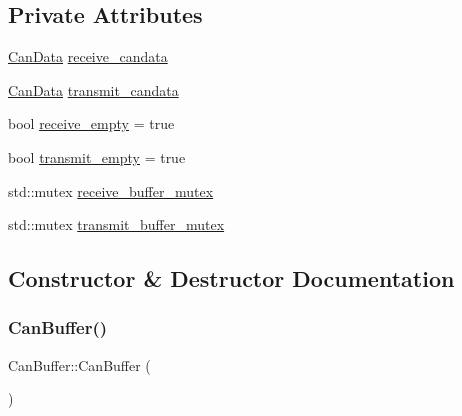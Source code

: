 \subsection*{Private Attributes}
\begin{DoxyCompactItemize}
\item 
\hyperlink{can__buffer_8h_a7a5dfa274d7d04c73e0b6b3e4dbbb87c}{Can\+Data} \hyperlink{classCanBuffer_a2f9526d98638e5c92695ba208a1a6084}{receive\+\_\+candata}
\item 
\hyperlink{can__buffer_8h_a7a5dfa274d7d04c73e0b6b3e4dbbb87c}{Can\+Data} \hyperlink{classCanBuffer_a8b7056beaeb5970d637001adb4722302}{transmit\+\_\+candata}
\item 
bool \hyperlink{classCanBuffer_a7a06170000a5bb8e66d6feed7ade64ad}{receive\+\_\+empty} = true
\item 
bool \hyperlink{classCanBuffer_a60d0c06e2b6ec133bc3d2b99872dc536}{transmit\+\_\+empty} = true
\item 
std\+::mutex \hyperlink{classCanBuffer_a99e2db7eb22a8f25ca92d5c5e791e99f}{receive\+\_\+buffer\+\_\+mutex}
\item 
std\+::mutex \hyperlink{classCanBuffer_aea5dc877a2bcdec8d3da11649346ca21}{transmit\+\_\+buffer\+\_\+mutex}
\end{DoxyCompactItemize}


\subsection{Constructor \& Destructor Documentation}
\mbox{\label{classCanBuffer_a02b0f8e006051bf73a8a0a70d0e919ec}} 
\subsubsection{\texorpdfstring{Can\+Buffer()}{CanBuffer()}\hspace{0.1cm}{\footnotesize\ttfamily [1/2]}}
{\footnotesize\ttfamily Can\+Buffer\+::\+Can\+Buffer (\begin{DoxyParamCaption}\item[{\hyperlink{classCanBuffer}{Can\+Buffer} const \&}]{ }\end{DoxyParamCaption})\hspace{0.3cm}{\ttfamily [delete]}}

\mbox{\label{classCanBuffer_a48282381b606242cfc4163e445c85409}} 
